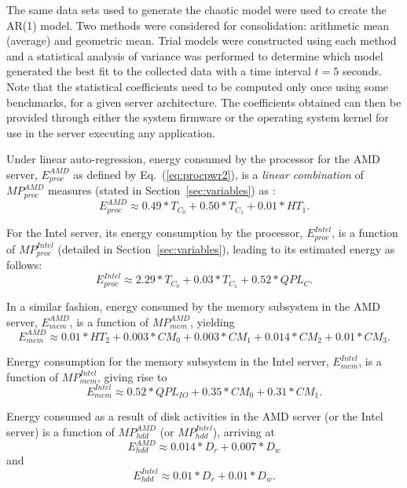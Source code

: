 \documentclass[acmtaco]{acmtrans2m}
\newcommand{\equationname}{Eq.}
\begin{document}
The same data sets used to generate the chaotic model were used to
create the AR(1) model. Two methods were considered for consolidation:
arithmetic mean (average) and geometric mean.  Trial models were
constructed using each method and a statistical analysis of variance was
performed to determine which model generated the best fit to the
collected data with a time interval $t=5$ seconds.  Note that the statistical coefficients need to be computed
only once using some benchmarks, for a given server architecture.
The coefficients obtained can then be provided through either
the system firmware or the operating system kernel for use in the server
executing any application.

Under linear auto-regression, energy consumed by the processor for the
AMD server, $E_{proc}^{AMD}$ as defined by
\equationname~(\ref{eq:procpwr2}), is a \textit{linear combination} of
$MP_{proc}^{AMD}$ measures (stated in Section~\ref{sec:variables}) as \cite{Lewis2008}:
\begin{equation*}
  \label{eq:apxproc}
  E_{proc}^{AMD} \approx 0.49*T_{C_{0}}+0.50*T_{C_{1}}+0.01*HT_{1}. 
\end{equation*}

For the Intel server, its energy consumption by the processor,
$E_{proc}^{Intel}$, is a function of $MP_{proc}^{Intel}$ (detailed in
Section~\ref{sec:variables}), leading to its estimated energy as follows:
\begin{equation*}
  \label{eq:apxpr}
  E_{proc}^{Intel} \approx 2.29*T_{C_{0}}+0.03*T_{C_{1}}+0.52*QPL_{C}.
\end{equation*}
 
In a similar fashion, energy consumed by the memory subsystem in the AMD server,
$E_{mem}^{AMD}$, is a function of $MP_{mem}^{AMD}$, yielding
\begin{equation*}
  \label{eq:apxmem}
  E_{mem}^{AMD} \approx 0.01*HT_{2}+0.003*CM_{0}+0.003*CM_{1}+0.014*CM_{2}+0.01*CM_{3}.
\end{equation*}

Energy consumption for the memory subsystem in the Intel server,
$E_{mem}^{Intel}$, is a function of $MP_{mem}^{Intel}$, giving rise to
\begin{equation*}
  E_{mem}^{Intel} \approx 0.52*QPL_{IO}+0.35*CM_{0}+0.31*CM_{1}. 
\end{equation*}

Energy consumed as a result of disk activities in the AMD server (or the
Intel server) is a function of $MP_{hdd}^{AMD}$ (or $MP_{hdd}^{Intel}$),
arriving at 
\begin{equation*}
E_{hdd}^{AMD} \approx 0.014*D_{r}+0.007*D_{w}
\end{equation*}
and
\begin{equation*}
E_{hdd}^{Intel} \approx 0.01*D_{r}+0.01*D_{w}.
\end{equation*}
\end{document}
